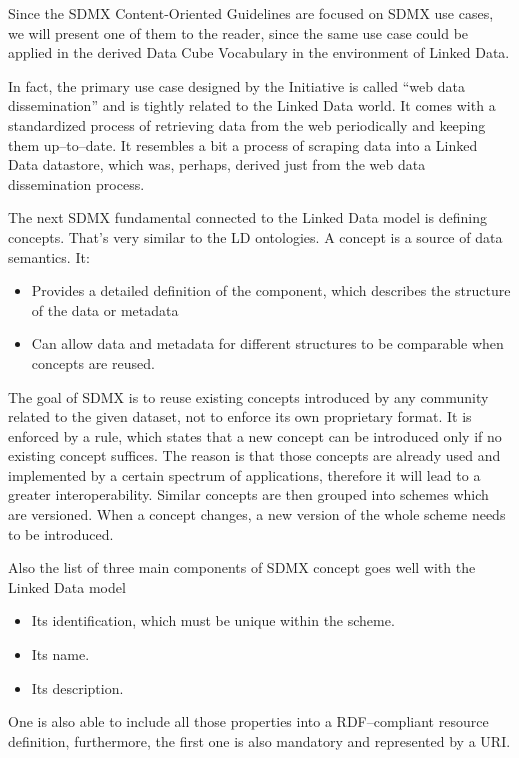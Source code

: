 Since the SDMX Content-Oriented Guidelines are focused on SDMX use cases, we will present
one of them to the reader, since the same use case could be applied in the derived Data Cube
Vocabulary in the environment of Linked Data.

In fact, the primary use case designed by the Initiative is called “web data dissemination”
and is tightly related to the Linked Data world. It comes with a standardized process of retrieving
data from the web periodically and keeping them up--to--date. It resembles a bit a process
of scraping data into a Linked Data datastore, which was, perhaps, derived just from the web
data dissemination process.

The next SDMX fundamental connected to the Linked Data model is defining concepts. That’s
very similar to the LD ontologies. A concept is a source of data semantics. It:

\begin{itemize}
\item Provides a detailed definition of the component, which describes the structure of the data or
metadata
\item Can allow data and metadata for different structures to be comparable when concepts are reused.
\end{itemize}

The goal of SDMX is to reuse existing concepts introduced by any community related to the
given dataset, not to enforce its own proprietary format. It is enforced by a rule, which states
that a new concept can be introduced only if no existing concept suffices. The reason
is that those concepts are already used and implemented by a certain spectrum of
applications, therefore it will lead to a greater interoperability. Similar concepts are then
grouped into schemes which are versioned. When a concept changes, a new version of the
whole scheme needs to be introduced.

Also the list of three main components of SDMX concept goes well with the Linked Data model

\begin{itemize}
\item Its identification, which must be unique within the scheme.
\item Its name.
\item Its description.
\end{itemize}

One is also able to include all those properties into a RDF--compliant resource definition,
furthermore, the first one is also mandatory and represented by a URI.

